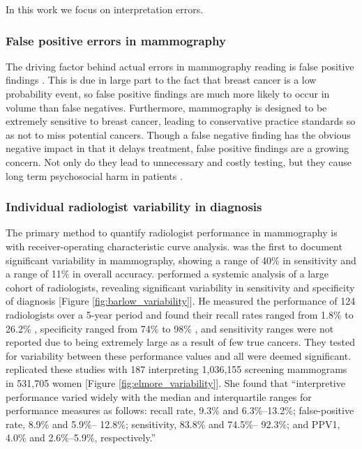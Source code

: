 In this work we focus on interpretation errors.

\subsubsection{False positive errors in mammography}
The driving factor behind actual errors in mammography reading is false positive findings \cite{Kerlikowske:2013ej}. This is due in large part to the fact that breast cancer is a low probability event, so false positive findings are much more likely to occur in volume than false negatives. Furthermore, mammography is designed to be extremely sensitive to breast cancer, leading to conservative practice standards so as not to miss potential cancers. Though a false negative finding has the obvious negative impact in that it delays treatment, false positive findings are a growing concern. Not only do they lead to unnecessary and costly testing, but they cause long term psychosocial harm in patients \cite{Brett:2005gq,Brodersen:2013kq}.


\subsubsection{Individual radiologist variability in diagnosis}
The primary method to quantify radiologist performance in mammography is with receiver-operating characteristic curve analysis.  was the first to document significant variability in mammography, showing a range of 40\% in sensitivity and a range of 11\% in overall accuracy. performed a systemic analysis of a large cohort of radiologists, revealing significant variability in sensitivity and specificity of diagnosis [Figure \ref{fig:barlow_variability}]. He measured the performance of 124 radiologists over a 5-year period and found their recall rates ranged from 1.8\% to 26.2\% , specificity ranged from 74\% to 98\% , and sensitivity ranges were not reported due to being extremely large as a result of few true cancers. They tested for variability between these performance values and all were deemed significant.  replicated these studies with 187 interpreting 1,036,155 screening mammograms in 531,705 women [Figure \ref{fig:elmore_variability}]. She found that ``interpretive performance varied widely with the median and interquartile ranges for performance measures as follows: recall rate, 9.3\% and 6.3\%–13.2\%; false-positive rate, 8.9\% and 5.9\%– 12.8\%; sensitivity, 83.8\% and 74.5\%– 92.3\%; and PPV1, 4.0\% and 2.6\%–5.9\%, respectively.''

